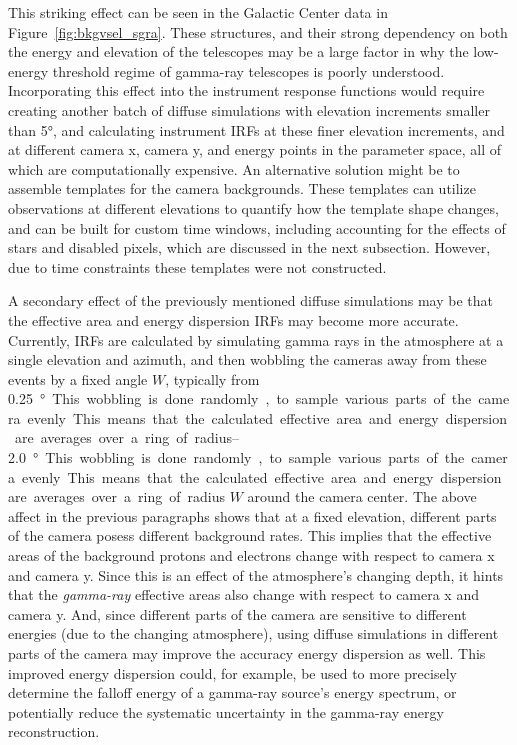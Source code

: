     This striking effect can be seen in the Galactic Center data in Figure~\ref{fig:bkgvsel_sgra}.
    These structures, and their strong dependency on both the energy and elevation of the telescopes may be a large factor in why the low-energy threshold regime of gamma-ray telescopes is poorly understood.
    Incorporating this effect into the instrument response functions would require creating another batch of diffuse simulations with elevation increments smaller than \ang{5}, and calculating instrument IRFs at these finer elevation increments, and at different camera x, camera y, and energy points in the parameter space, all of which are computationally expensive.
    An alternative solution might be to assemble templates for the camera backgrounds.
    These templates can utilize observations at different elevations to quantify how the template shape changes, and can be built for custom time windows, including accounting for the effects of stars and disabled pixels, which are discussed in the next subsection.
    However, due to time constraints these templates were not constructed.
    
    A secondary effect of the previously mentioned diffuse simulations may be that the effective area and energy dispersion IRFs may become more accurate.
    Currently, IRFs are calculated by simulating gamma rays in the atmosphere at a single elevation and azimuth, and then wobbling the cameras away from these events by a fixed angle $W$, typically from \SIrange{0.25}{2.0}\degree.
    This wobbling is done randomly, to sample various parts of the camera evenly.
    This means that the calculated effective area and energy dispersion are averages over a ring of radius $W$ around the camera center.
    The above affect in the previous paragraphs shows that at a fixed elevation, different parts of the camera posess different background rates.
    This implies that the effective areas of the background protons and electrons change with respect to camera x and camera y.
    Since this is an effect of the atmosphere's changing depth, it hints that the \textit{gamma-ray} effective areas also change with respect to camera x and camera y.
    And, since different parts of the camera are sensitive to different energies (due to the changing atmosphere), using diffuse simulations in different parts of the camera may improve the accuracy energy dispersion as well.
    This improved energy dispersion could, for example, be used to more precisely determine the falloff energy of a gamma-ray source's energy spectrum, or potentially reduce the systematic uncertainty in the gamma-ray energy reconstruction.
  
